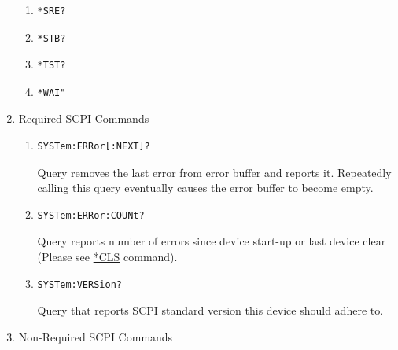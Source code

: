 \documentclass[a4paper,10pt]{article}
\begin{document}
\begin{enumerate}
\begin{enumerate}
        \item \begin{verbatim}*SRE?\end{verbatim}
        \item \begin{verbatim}*STB?\end{verbatim}
        \item \begin{verbatim}*TST?\end{verbatim}
        \item \begin{verbatim}*WAI"\end{verbatim}
    \end{enumerate}
\item Required SCPI Commands
    \begin{enumerate}
        \item 
            \begin{verbatim}SYSTem:ERRor[:NEXT]?\end{verbatim}
            \begin{description}
                Query removes the last error from error buffer and reports it. Repeatedly calling this query eventually causes the error buffer to become empty.
            \end{description}
        \item 
            \begin{verbatim}SYSTem:ERRor:COUNt?\end{verbatim}
            \begin{description}
                Query reports number of errors since device start-up or last device clear (Please see \hyperlink{cls}{*CLS} command).
            \end{description}
        \item 
            \begin{verbatim}SYSTem:VERSion?\end{verbatim}
            \begin{description}
                Query that reports SCPI standard version this device should adhere to.
            \end{description}
    \end{enumerate}
\item Non-Required SCPI Commands

\end{enumerate}
\end{document}

